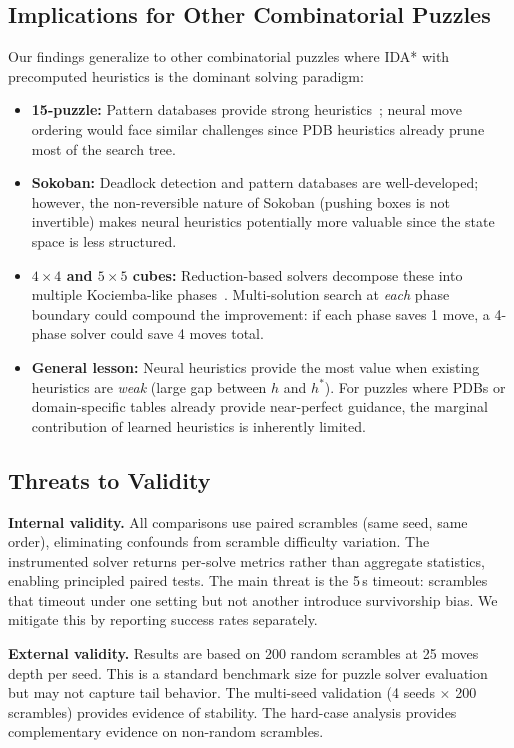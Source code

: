 \documentclass[conference]{IEEEtran}
\begin{document}
\subsection{Implications for Other Combinatorial Puzzles}
\label{sec:other-puzzles}

Our findings generalize to other combinatorial puzzles where IDA* with precomputed heuristics is the dominant solving paradigm:

\begin{itemize}[leftmargin=*]
  \item \textbf{15-puzzle:} Pattern databases provide strong heuristics~\cite{korf2000}; neural move ordering would face similar challenges since PDB heuristics already prune most of the search tree.
  \item \textbf{Sokoban:} Deadlock detection and pattern databases are well-developed; however, the non-reversible nature of Sokoban (pushing boxes is not invertible) makes neural heuristics potentially more valuable since the state space is less structured.
  \item \textbf{$4{\times}4$ and $5{\times}5$ cubes:} Reduction-based solvers decompose these into multiple Kociemba-like phases~\cite{demaine2018}. Multi-solution search at \emph{each} phase boundary could compound the improvement: if each phase saves 1 move, a 4-phase solver could save 4 moves total.
  \item \textbf{General lesson:} Neural heuristics provide the most value when existing heuristics are \emph{weak} (large gap between $h$ and $h^*$). For puzzles where PDBs or domain-specific tables already provide near-perfect guidance, the marginal contribution of learned heuristics is inherently limited.
\end{itemize}

\subsection{Threats to Validity}

\textbf{Internal validity.} All comparisons use paired scrambles (same seed, same order), eliminating confounds from scramble difficulty variation. The instrumented solver returns per-solve metrics rather than aggregate statistics, enabling principled paired tests. The main threat is the 5\,s timeout: scrambles that timeout under one setting but not another introduce survivorship bias. We mitigate this by reporting success rates separately.

\textbf{External validity.} Results are based on 200 random scrambles at 25 moves depth per seed. This is a standard benchmark size for puzzle solver evaluation but may not capture tail behavior. The multi-seed validation (4 seeds $\times$ 200 scrambles) provides evidence of stability. The hard-case analysis provides complementary evidence on non-random scrambles.
\end{document}
